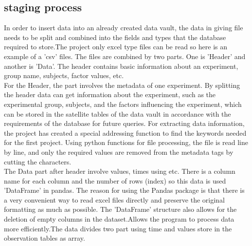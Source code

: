 \documentclass[conference]{IEEEtran}
\begin{document}
\subsection{staging process}\label{AA}
In order to insert data into an already created data vault, the data in giving file needs to be split and combined into the fields and types that the database required to store.The project only excel type files can be read so here is an example of a 'csv' files. The files are combined by two parts. One is 'Header' and another is 'Data'. The header contains basic information about an experiment, group name, subjects, factor values, etc.\\
\hspace*{0.2cm} For the Header, the part involves the metadata of one experiment. By splitting the header data can get information about the experiment, such as the experimental group, subjects, and the factors influencing the experiment, which can be stored in the satellite tables of the data vault in accordance with the requirements of the database for future queries. For extracting data information, the project has created a special addressing function to find the keywords needed for the first project. Using python functions for file processing, the file is read line by line, and only the required values are removed from the metadata tags by cutting the characters.\\
\hspace*{0.2cm} The Data part after header involve values, times using etc. There is a column name for each column and the number of rows (index) so this data is used 'DataFrame' in pandas. The reason for using the Pandas package is that there is a very convenient way to read excel files directly and preserve the original formatting as much as possible. The 'DataFrame' structure also allows for the deletion of empty columns in the dataset.Allows the program to process data more efficiently.The data divides two part using time and values store in the observation tables as array.
\end{document}
